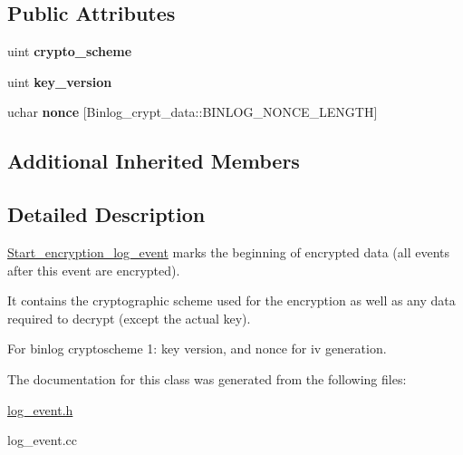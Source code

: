 \subsection*{Public Attributes}
\begin{DoxyCompactItemize}
\item 
\mbox{\label{classStart__encryption__log__event_a3922e517c39c9f3bfdae1cf95af9c000}} 
uint {\bfseries crypto\+\_\+scheme}
\item 
\mbox{\label{classStart__encryption__log__event_a7e0d8026e095840b3cc24f3b2ff43d0f}} 
uint {\bfseries key\+\_\+version}
\item 
\mbox{\label{classStart__encryption__log__event_a642038d466f8501e830570e40aedf016}} 
uchar {\bfseries nonce} \mbox{[}Binlog\+\_\+crypt\+\_\+data\+::\+B\+I\+N\+L\+O\+G\+\_\+\+N\+O\+N\+C\+E\+\_\+\+L\+E\+N\+G\+TH\mbox{]}
\end{DoxyCompactItemize}
\subsection*{Additional Inherited Members}


\subsection{Detailed Description}
\mbox{\hyperlink{classStart__encryption__log__event}{Start\+\_\+encryption\+\_\+log\+\_\+event}} marks the beginning of encrypted data (all events after this event are encrypted).

It contains the cryptographic scheme used for the encryption as well as any data required to decrypt (except the actual key).

For binlog cryptoscheme 1\+: key version, and nonce for iv generation. 

The documentation for this class was generated from the following files\+:\begin{DoxyCompactItemize}
\item 
\mbox{\hyperlink{log__event_8h}{log\+\_\+event.\+h}}\item 
log\+\_\+event.\+cc\end{DoxyCompactItemize}
